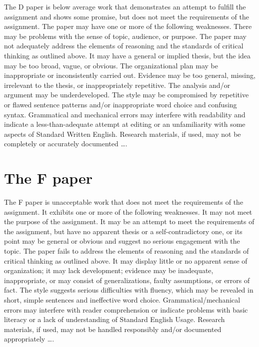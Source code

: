 The D paper is below average work that demonstrates an attempt to fulfill the 
assignment and shows some promise, but does not meet the requirements of the 
assignment. The paper may have one or more of the following weaknesses. There may 
be problems with the sense of topic, audience, or purpose. The paper may not 
adequately address the elements of reasoning and the standards of critical thinking as 
outlined above. It may have a general or implied thesis, but the idea may be too broad, 
vague, or obvious. The organizational plan may be inappropriate or inconsistently carried 
out. Evidence may be too general, missing, irrelevant to the thesis, or inappropriately 
repetitive. The analysis and/or argument may be underdeveloped. The style may be 
compromised by repetitive or flawed sentence patterns and/or inappropriate word 
choice and confusing syntax. Grammatical and mechanical errors may interfere with 
readability and indicate a less-than-adequate attempt at editing or an unfamiliarity with 
some aspects of Standard Written English. Research materials, if used, may not be 
completely or accurately documented \dots.

\section{The F paper}

The F paper is unacceptable work that does not meet the requirements of the 
assignment. It exhibits one or more of the following weaknesses. It may not meet the 
purpose of the assignment. It may be an attempt to meet the requirements of the 
assignment, but have no apparent thesis or a self-contradictory one, or its point may 
be general or obvious and suggest no serious engagement with the topic. The paper 
fails to address the elements of reasoning and the standards of critical thinking as 
outlined above. It may display little or no apparent sense of organization; it may lack 
development; evidence may be inadequate, inappropriate, or may consist of 
generalizations, faulty assumptions, or errors of fact. The style suggests serious 
difficulties with fluency, which may be revealed in short, simple sentences and 
ineffective word choice. Grammatical/mechanical errors may interfere with reader 
comprehension or indicate problems with basic literacy or a lack of understanding of 
Standard English Usage. Research materials, if used, may not be handled responsibly 
and/or documented appropriately \dots.

